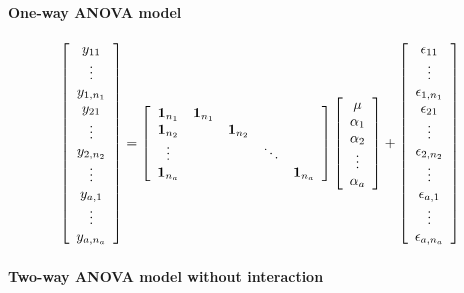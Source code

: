 \paragraph{One-way ANOVA model}
$$
\left[ \begin{array}{c} y_{11}\\ \vdots \\ y_{1, n_1}\\  y_{21} \\ \vdots \\ y_{2, n_2} \\ \vdots \\ y_{a,1} \\ \vdots \\ y_{a, n_a}\\ \end{array} \right] =
\left[ \begin{array}{ccccc} \mathbf{1}_{n_1}   & \mathbf{1}_{n_1} &  & & \\ \mathbf{1}_{n_2} &  & \mathbf{1}_{n_2} & & \\ \vdots &  & & \ddots & \\ \mathbf{1}_{n_a} & &  &  & \mathbf{1}_{n_a}\\ \end{array} \right] \left[ \begin{array}{c} \mu\\ \alpha_1 \\ \alpha_2\\ \vdots \\ \alpha_a \end{array} \right] +
\left[ \begin{array}{c} \epsilon_{11}\\ \vdots \\ \epsilon_{1, n_1}\\  \epsilon_{21} \\ \vdots \\ \epsilon_{2, n_2} \\ \vdots \\ \epsilon_{a,1} \\ \vdots \\ \epsilon_{a, n_a}\\ \end{array} \right]
$$

\paragraph{Two-way ANOVA model without interaction}


